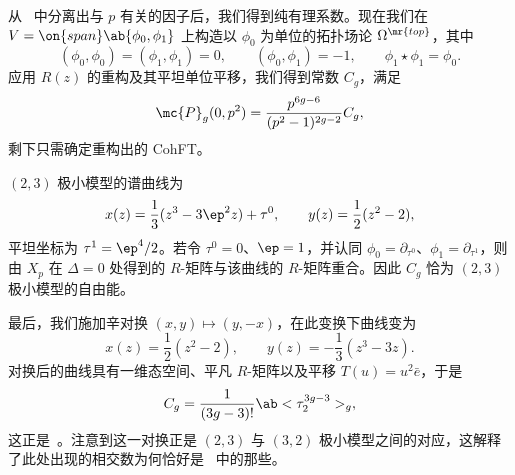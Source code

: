 从~ 中分离出与 \(p\) 有关的因子后，我们得到纯有理系数。现在我们在 \(V = \on{span}\ab\{\phi_0,\phi_1\}\) 上构造以 \(\phi_0\) 为单位的拓扑场论 \(\Omega^{\mr{top}}\)，其中
\[ (\phi_0,\phi_0) = (\phi_1,\phi_1) = 0, \qquad (\phi_0,\phi_1) = -1, \qquad \phi_1 \star \phi_1 = \phi_0. \]
应用 \(R(z)\) 的重构及其平坦单位平移，我们得到常数 \(C_g\)，满足
\[ \mc{P}_g(0,p^2) = \frac{p^{6g-6}}{(p^2-1)^{2g-2}}C_g, \]
剩下只需确定重构出的 CohFT。

\((2,3)\) 极小模型的谱曲线为
\[ x(z) = \frac{1}{3}(z^3-3\ep^2 z) + \tau^0, \qquad y(z) = \frac{1}{2}(z^2-2), \]
平坦坐标为 \(\tau^1 = \ep^4/2\)。若令 \(\tau^0 = 0\)、\(\ep = 1\)，并认同 \(\phi_0 = \partial_{\tau^0}\)、\(\phi_1 = \partial_{\tau^1}\)，则由 \(X_p\) 在 \(\Delta = 0\) 处得到的 \(R\)-矩阵与该曲线的 \(R\)-矩阵重合。因此 \(C_g\) 恰为 \((2,3)\) 极小模型的自由能。

最后，我们施加辛对换 \((x,y) \mapsto (y,-x)\)，在此变换下曲线变为
\[ x(z) = \frac{1}{2}(z^2-2), \qquad y(z) = -\frac{1}{3}(z^3-3z). \]
对换后的曲线具有一维态空间、平凡 \(R\)-矩阵以及平移 \(T(u) = u^2 \bar{e}\)，于是
\[ C_g = \frac{1}{(3g-3)!}\ab<\tau_2^{3g-3}>_g, \]
这正是~。注意到这一对换正是 \((2,3)\) 与 \((3,2)\) 极小模型之间的对应，这解释了此处出现的相交数为何恰好是~ 中的那些。

